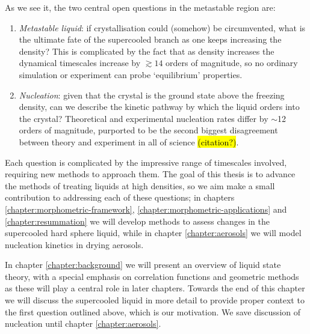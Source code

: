 \documentclass[11pt,twoside]{report}
\begin{document}
As we see it, the two central open questions in the metastable region are:
\begin{enumerate}
\item \emph{Metastable liquid}: if crystallisation could (somehow) be circumvented, what is the ultimate fate of the supercooled branch as one keeps increasing the density?
  This is complicated by the fact that as density increases the dynamical timescales increase by $\gtrsim 14$ orders of magnitude, so no ordinary simulation or experiment can probe `equilibrium' properties.
\item \emph{Nucleation}: given that the crystal is the ground state above the freezing density, can we describe the kinetic pathway by which the liquid orders into the crystal?
  Theoretical and experimental nucleation rates differ by $\sim$12 orders of magnitude, purported to be the second biggest disagreement between theory and experiment in all of science \hl{(citation?)}.
\end{enumerate}
Each question is complicated by the impressive range of timescales involved, requiring new methods to approach them.
The goal of this thesis is to advance the methods of treating liquids at high densities, so we aim make a small contribution to addressing each of these questions; in chapters \ref{chapter:morphometric-framework}, \ref{chapter:morphometric-applications} and \ref{chapter:resummation} we will develop methods to assess changes in the supercooled hard sphere liquid, while in chapter \ref{chapter:aerosols} we will model nucleation kinetics in drying aerosols.


In chapter \ref{chapter:background} we will present an overview of liquid state theory, with a special emphasis on correlation functions and geometric methods as these will play a central role in later chapters.
Towards the end of this chapter we will discuss the supercooled liquid in more detail to provide proper context to the first question outlined above, which is our motivation.
We save discussion of nucleation until chapter \ref{chapter:aerosols}.
\end{document}
